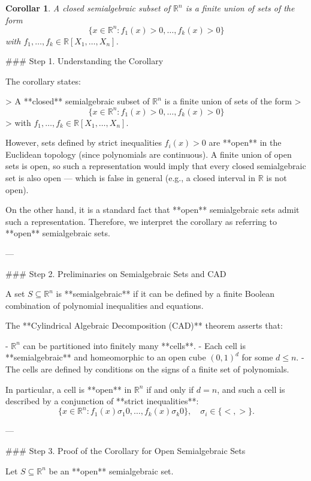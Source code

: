 \documentclass[12pt]{article}
\theoremstyle{mythm}
\let\oldendproof\endproof
\renewenvironment{proof}[1][\proofname]{%
  \oldproof[\normalfont \bfseries \sffamily #1]%
}{\oldendproof}
\renewcommand*{\proofname}{Proof}
\renewcommand*{\proofname}{Proof}
\newtheorem{cor}{Corollar}[section]
\renewcommand*{\proofname}{Proof}
\renewcommand*{\proofname}{Proof}
\renewcommand*{\proofname}{Proof}
\renewcommand*{\proofname}{Proof}
\renewcommand*{\proofname}{Proof}
\begin{document}
\begin{cor}
    A closed semialgebraic subset of $\mathbb{R}^n$ is a finite union of sets of the form 
\[\{x \in \mathbb{R}^n : f_1(x) > 0, \ldots, f_k(x) > 0\}\]
with $f_1, \ldots, f_k \in \mathbb{R}[X_1, \ldots, X_n]$.
\end{cor}
\begin{proof}
    ### Step 1. Understanding the Corollary

The corollary states:

> A **closed** semialgebraic subset of \(\mathbb{R}^n\) is a finite union of sets of the form  
> \[
\{x \in \mathbb{R}^n : f_1(x) > 0, \ldots, f_k(x) > 0\}
\]  
> with \(f_1, \ldots, f_k \in \mathbb{R}[X_1, \ldots, X_n]\).

However, sets defined by strict inequalities \(f_i(x) > 0\) are **open** in the Euclidean topology (since polynomials are continuous). A finite union of open sets is open, so such a representation would imply that every closed semialgebraic set is also open — which is false in general (e.g., a closed interval in \(\mathbb{R}\) is not open).

On the other hand, it is a standard fact that **open** semialgebraic sets admit such a representation. Therefore, we interpret the corollary as referring to **open** semialgebraic sets.

---

### Step 2. Preliminaries on Semialgebraic Sets and CAD

A set \(S \subseteq \mathbb{R}^n\) is **semialgebraic** if it can be defined by a finite Boolean combination of polynomial inequalities and equations.

The **Cylindrical Algebraic Decomposition (CAD)** theorem asserts that:

- \(\mathbb{R}^n\) can be partitioned into finitely many **cells**.
- Each cell is **semialgebraic** and homeomorphic to an open cube \((0,1)^d\) for some \(d \leq n\).
- The cells are defined by conditions on the signs of a finite set of polynomials.

In particular, a cell is **open** in \(\mathbb{R}^n\) if and only if \(d = n\), and such a cell is described by a conjunction of **strict inequalities**:
\[
\{x \in \mathbb{R}^n : f_1(x) \sigma_1 0, \ldots, f_k(x) \sigma_k 0\}, \quad \sigma_i \in \{<, >\}.
\]

---

### Step 3. Proof of the Corollary for Open Semialgebraic Sets

Let \(S \subseteq \mathbb{R}^n\) be an **open** semialgebraic set.


\end{proof}
\end{document}
